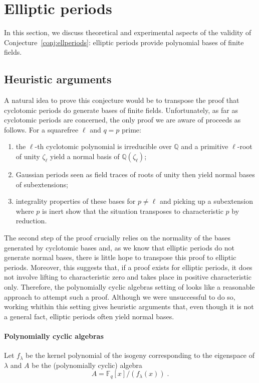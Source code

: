 \documentclass[12pt]{article}
\theoremstyle{plain}
\theoremstyle{definition}
\def\Q{\ensuremath{\mathbb{Q}}}
\def\F{\ensuremath{\mathbb{F}}}
\begin{document}
\section{Elliptic periods}
\label{app:ellprdsdata}

In this section, we discuss theoretical and experimental aspects
of the validity of Conjecture~\ref{conj:ellperiods}:
elliptic periods provide polynomial bases of finite fields.

\subsection{Heuristic arguments}

A natural idea to prove this conjecture would be to transpose
the proof that cyclotomic periods do generate bases of finite fields.
Unfortunately, as far as cyclotomic periods are concerned,
the only proof we are aware of proceeds as follows.
For a squarefree $\ell$ and $q = p$ prime:
\begin{enumerate}
\item the $\ell$-th cyclotomic polynomial is irreducible over $\Q$ and
a primitive $\ell$-root of unity $\zeta_\ell$ yield a normal basis
of $\Q(\zeta_\ell)$;
\item Gaussian periods seen as field traces of roots of unity
then yield normal bases of subextensions;
\item integrality properties of these bases for $p \neq \ell$
and picking up a subextension where $p$ is inert show that
the situation transposes to characteristic $p$ by reduction.
\end{enumerate}
The second step of the proof crucially relies on the normality
of the bases generated by cyclotomic bases and, as we know
that elliptic periods do not generate normal bases,
there is little hope to transpose this proof to elliptic periods.
Moreover, this suggests that, if a proof exists for elliptic periods,
it does not involve lifting to characteristic zero
and takes place in positive characteristic only.
Therefore, the polynomially cyclic algebras setting of \cite{Mihailescu2010825}
looks like a reasonable approach to attempt such a proof.
Although we were unsuccessful to do so, working whithin this setting gives
heuristic arguments that, even though it is not a general fact,
elliptic periods often yield normal bases.

\paragraph{Polynomially cyclic algebras}
Let $f_\lambda$ be the kernel polynomial of the isogeny corresponding
to the eigenspace of $\lambda$ and $A$ be the (polynomially cyclic)
algebra
\[
A = \F_q[x]/(f_\lambda(x)) \; .
\]
\end{document}
